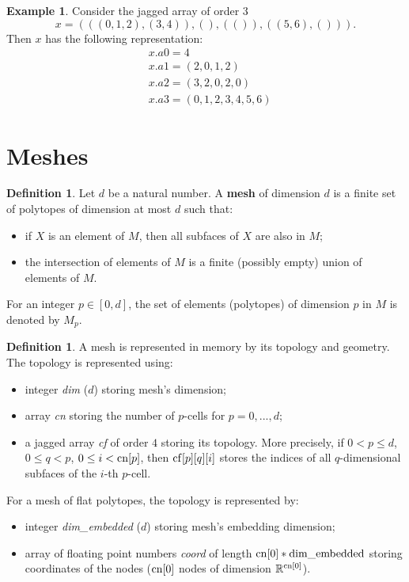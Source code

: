 \documentclass[fleqn]{article}
\theoremstyle{definition}
\newtheorem{definition}[theorem]{Definition}
\newtheorem{example}[theorem]{Example}
\begin{document}
\begin{example}
  Consider the jagged array of order $3$
  \begin{equation}
    x = (((0, 1, 2), (3, 4)), (), (()), ((5, 6), ())).
  \end{equation}
  Then $x$ has the following representation:
  \begin{equation}
    \begin{split}
      & x.a0 = 4 \\
      & x.a1 = (2, 0, 1, 2) \\
      & x.a2 = (3, 2, 0, 2, 0) \\
      & x.a3 = (0, 1, 2, 3, 4 , 5, 6)
    \end{split}
  \end{equation}
\end{example}

\section{Meshes}

\begin{definition}
  Let $d$ be a natural number.
  A \textbf{mesh} of dimension $d$ is a finite set of polytopes of dimension at
  most $d$ such that:
  \begin{itemize}
    \item
      if $X$ is an element of $M$, then all subfaces of $X$ are also in $M$;
    \item
      the intersection of elements of $M$ is a finite (possibly empty) union of
      elements of $M$.
  \end{itemize}
  For an integer $p \in [0, d]$, the set of elements (polytopes) of dimension
  $p$ in $M$ is denoted by $M_p$.
\end{definition}

\begin{definition}
  A mesh is represented in memory by its topology and geometry.
  The topology is represented using:
  \begin{itemize}
    \item
      integer \emph{dim} ($d$) storing mesh's dimension;
    \item
      array \emph{cn} storing the number of $p$-cells for $p = 0, ..., d$; 
    \item
      a jagged array \emph{cf} of order $4$ storing its topology.
      More precisely, if $0 < p \leq d$, $0 \leq q < p$,
      $0 \leq i < {\rm cn}[p]$, then ${\rm cf}[p][q][i]$ stores the indices of
      all $q$-dimensional subfaces of the $i$-th $p$-cell.
  \end{itemize}
  For a mesh of flat polytopes, the topology is represented by:
  \begin{itemize}
    \item
      integer \emph{dim\_embedded} ($d$) storing mesh's embedding dimension;
    \item
      array of floating point numbers \emph{coord} of length
      ${\rm cn}[0] * {\rm dim\_embedded}$ storing coordinates of the nodes
      (${\rm cn}[0]$ nodes of dimension $\mathbb{R}^{{\rm cn}[0]}$).
  \end{itemize}
\end{definition}
\end{document}
